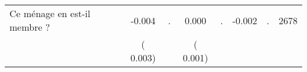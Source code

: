 \begin{tabular}{l*{7}{c}}
 Ce ménage en est-il membre ?       &             -0.004       &            .  &              0.000       &            .  &             -0.002       &                  . &  2678 \\ 
                       &       (       0.003)             &                               &       (       0.001)                     &                               &                                               &                                &                      \\ 

\hline \end{tabular}